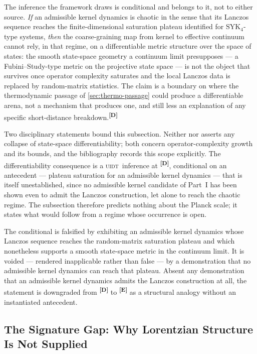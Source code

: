\documentclass[12pt,a4paper,twoside]{article}
\theoremstyle{plain}
\theoremstyle{definition}
\theoremstyle{remark}
\newcommand{\UIDT}{\textsc{uidt}}
\newcommand{\catmark}[1]{\textsuperscript{\textsf{\textbf{[#1]}}}}
\begin{document}
The inference the framework draws is conditional and belongs to it, not to
either source. \emph{If} an admissible kernel dynamics is chaotic in the
sense that its Lanczos sequence reaches the finite-dimensional saturation
plateau identified for $\mathrm{SYK}_4$-type systems, \emph{then} the
coarse-graining map from kernel to effective continuum cannot rely, in that
regime, on a differentiable metric structure over the space of states: the
smooth state-space geometry a continuum limit presupposes --- a
Fubini--Study-type metric on the projective state space --- is not the
object that survives once operator complexity saturates and the local
Lanczos data is replaced by random-matrix statistics. The claim is a
boundary on where the thermodynamic passage of \cref{sec:thermo-passage}
could produce a differentiable arena, not a mechanism that produces one,
and still less an explanation of any specific short-distance
breakdown.\catmark{D}

Two disciplinary statements bound this subsection. Neither
\cite{parker2019} nor \cite{rabinovici2021} asserts any collapse of
state-space differentiability; both concern operator-complexity growth and
its bounds, and the bibliography records this scope explicitly. The
differentiability consequence is a \UIDT\ inference at \catmark{D},
conditional on an antecedent --- plateau saturation for an admissible
kernel dynamics --- that is itself unestablished, since no admissible
kernel candidate of Part~I has been shown even to admit the Lanczos
construction, let alone to reach the chaotic regime. The subsection
therefore predicts nothing about the Planck scale; it states what would
follow from a regime whose occurrence is open.

\begin{killswitch}
The conditional is falsified by exhibiting an admissible kernel dynamics
whose Lanczos sequence reaches the random-matrix saturation plateau and
which nonetheless supports a smooth state-space metric in the continuum
limit. It is voided --- rendered inapplicable rather than false --- by a
demonstration that no admissible kernel dynamics can reach that plateau.
Absent any demonstration that an admissible kernel dynamics admits the
Lanczos construction at all, the statement is downgraded from \catmark{D}
to \catmark{E} as a structural analogy without an instantiated antecedent.
\end{killswitch}

\subsection{The Signature Gap: Why Lorentzian Structure Is Not Supplied}
\label{subsec:signature-gap}
\end{document}
